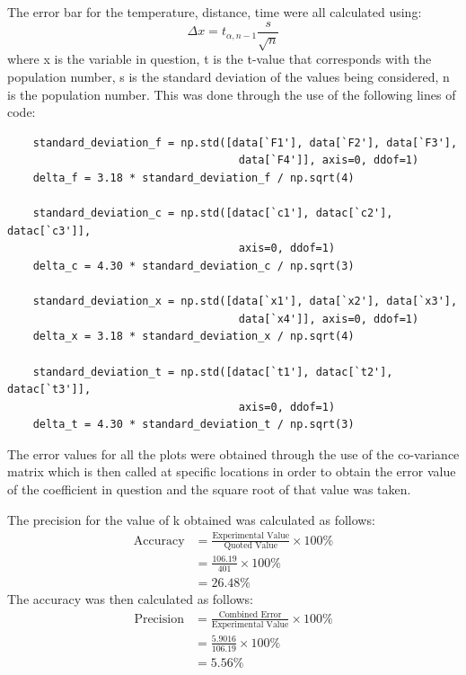 \documentclass[12pt, a4paper]{article}
\begin{document}
\noindent
The error bar for the temperature, distance, time were all calculated using:
\begin{equation}
        \Delta x = t_{\alpha, n-1} \frac{s}{\sqrt{n}}
\end{equation}
where x is the variable in question, t is the t-value that corresponds with the population number, s is the standard deviation of the values being considered, n is the population number. This was done through the use of the following lines of code:
\begin{verbatim}
    standard_deviation_f = np.std([data[`F1'], data[`F2'], data[`F3'],
                                    data[`F4']], axis=0, ddof=1)
    delta_f = 3.18 * standard_deviation_f / np.sqrt(4)

    standard_deviation_c = np.std([datac[`c1'], datac[`c2'], datac[`c3']],
                                    axis=0, ddof=1)
    delta_c = 4.30 * standard_deviation_c / np.sqrt(3)

    standard_deviation_x = np.std([data[`x1'], data[`x2'], data[`x3'],
                                    data[`x4']], axis=0, ddof=1)
    delta_x = 3.18 * standard_deviation_x / np.sqrt(4)

    standard_deviation_t = np.std([datac[`t1'], datac[`t2'], datac[`t3']],
                                    axis=0, ddof=1)
    delta_t = 4.30 * standard_deviation_t / np.sqrt(3)
\end{verbatim}


\noindent
The error values for all the plots were obtained through the use of the co-variance matrix which is then called at specific locations in order to obtain the error value of the coefficient in question and the square root of that value was taken.


\noindent
The precision for the value of k obtained was calculated as follows:
\begin{align*}
    \text{Accuracy} &= \frac{\text{Experimental Value}}{\text{Quoted Value}} \times 100 \%\\
    &= \frac{106.19}{401} \times 100\%\\
    &= 26.48\%
\end{align*}
The accuracy was then calculated as follows:
\begin{align*}
    \text{Precision} &= \frac{\text{Combined Error}}{\text{Experimental Value}} \times 100\%\\
    &= \frac{5.9016}{106.19} \times 100\% \\
    &= 5.56\%
\end{align*}
\end{document}
